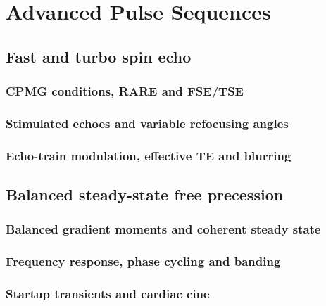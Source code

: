 \chapter{Advanced Pulse Sequences}
\label{ch:08}

\section{Fast and turbo spin echo}
\label{sec:08:fast-and-turbo-spin-echo}
\subsection{CPMG conditions, RARE and FSE/TSE}
\subsection{Stimulated echoes and variable refocusing angles}
\subsection{Echo-train modulation, effective TE and blurring}

\section{Balanced steady-state free precession}
\label{sec:08:balanced-steady-state-free-precession}
\subsection{Balanced gradient moments and coherent steady state}
\subsection{Frequency response, phase cycling and banding}
\subsection{Startup transients and cardiac cine}

